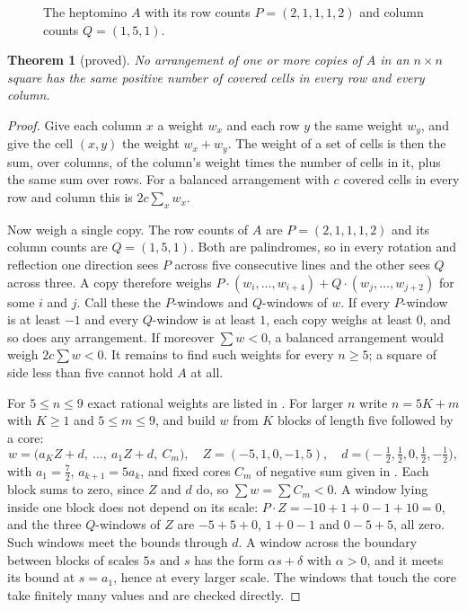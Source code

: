 \documentclass[11pt]{amsart}
\newtheorem{theorem}{Theorem}
\theoremstyle{remark}
\begin{document}
\begin{figure}[ht]
\centering

\caption{The heptomino $A$ with its row counts $P=(2,1,1,1,2)$ and column counts $Q=(1,5,1)$.}
\label{fig:heptomino}
\end{figure}

\begin{theorem}[proved]\label{thm:heptomino}
No arrangement of one or more copies of $A$ in an $n\times n$ square has the same positive number of
covered cells in every row and every column.
\end{theorem}

\begin{proof}
Give each column $x$ a weight $w_x$ and each row $y$ the same weight $w_y$, and give the cell $(x,y)$
the weight $w_x+w_y$. The weight of a set of cells is then the sum, over columns, of the column's
weight times the number of cells in it, plus the same sum over rows. For a balanced arrangement with
$c$ covered cells in every row and column this is $2c\sum_x w_x$.

Now weigh a single copy. The row counts of $A$ are $P=(2,1,1,1,2)$ and its column counts are
$Q=(1,5,1)$. Both are palindromes, so in every rotation and reflection one direction sees $P$ across
five consecutive lines and the other sees $Q$ across three. A copy therefore weighs
$P\cdot(w_i,\dots,w_{i+4})+Q\cdot(w_j,\dots,w_{j+2})$ for some $i$ and $j$. Call these the $P$-windows
and $Q$-windows of $w$. If every $P$-window is at least $-1$ and every $Q$-window is at least $1$, each
copy weighs at least $0$, and so does any arrangement. If moreover $\sum w<0$, a balanced arrangement
would weigh $2c\sum w<0$. It remains to find such weights for every $n\ge5$; a square of side less than
five cannot hold $A$ at all.

For $5\le n\le 9$ exact rational weights are listed in .
For larger $n$ write $n=5K+m$ with $K\ge1$ and $5\le m\le 9$, and build $w$ from $K$ blocks of length
five followed by a core:
\[
w=\bigl(a_KZ+d,\ \dots,\ a_1Z+d,\ C_m\bigr),\quad Z=(-5,1,0,-1,5),\quad
d=\bigl(-\tfrac12,\tfrac12,0,\tfrac12,-\tfrac12\bigr),
\]
with $a_1=\tfrac72$, $a_{k+1}=5a_k$, and fixed cores $C_m$ of negative sum given in
. Each block sums to zero, since $Z$ and $d$ do, so $\sum w=\sum C_m<0$. A
window lying inside one block does not depend on its scale: $P\cdot Z=-10+1+0-1+10=0$, and the
three $Q$-windows of $Z$ are $-5+5+0$, $1+0-1$ and $0-5+5$, all zero. Such windows meet the bounds
through $d$. A window across the boundary between blocks of scales $5s$ and $s$ has
the form $\alpha s+\delta$ with $\alpha>0$, and it meets its bound at $s=a_1$, hence at every larger
scale. The windows that touch the core take finitely many values and are checked directly.
\end{proof}
\end{document}
